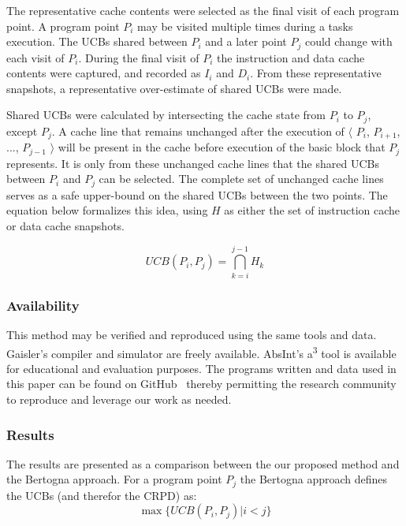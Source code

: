 The representative cache contents were selected as the final visit of
each program point. A program point ${P_i}$ may be visited multiple
times during a tasks execution. The UCBs shared between ${P_i}$ and a
later point ${P_j}$ could change with each visit of ${P_i}$. During
the final visit of ${P_i}$ the instruction and data cache contents
were captured, and recorded as ${I_i}$ and ${D_i}$. From these
representative snapshots, a representative over-estimate of shared
UCBs were made.

Shared UCBs were calculated by intersecting the cache state from ${P_i}$
to ${P_j}$, except ${P_j}$. A cache line that remains unchanged after
the execution of ${\langle}$ ${P_i}$, ${P_{i+1}}$, ..., ${P_{j-1}}$
${\rangle}$ will be
present in the cache before execution of the basic block that ${P_j}$
represents. It is only from these unchanged cache lines that the shared UCBs
between ${P_i}$ and ${P_j}$ can be selected. The complete set of
unchanged cache lines serves as a safe upper-bound on the shared UCBs
between the two points. The equation below formalizes this idea, using
${H}$ as either the set of instruction cache or data cache snapshots.
\vspace{-20pt}
\begin{center}
  \begin{equation*}
    UCB(P_i, P_j) = \bigcap_{k=i}^{j-1} H_k
  \end{equation*}
\end{center}

\subsubsection{Availability}

This method may be verified and reproduced using the same tools and
data. Gaisler's compiler and simulator are freely available. AbsInt's
a\textsuperscript{3} tool is available for educational and evaluation
purposes. The programs written and data used in this paper can be
found on GitHub~\cite{tessler:14} thereby permitting the research community
to reproduce and leverage our work as needed.

\subsubsection{Results}

The results are presented as a comparison between the our proposed
method and the Bertogna approach. For a program point ${P_j}$ the
Bertogna \cite{bertogna:11} approach defines the UCBs (and therefor the CRPD) as:
\begin{equation*}
  \max\{ UCB(P_i, P_j) \vert i < j \}
\end{equation*}

